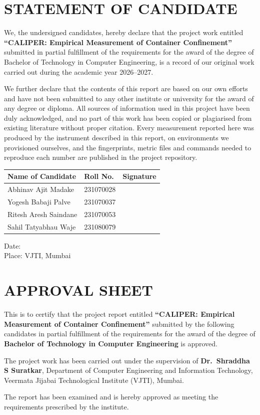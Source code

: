 \documentclass[12pt,a4paper,openany,oneside]{report}
\newcommand{\projecttitle}{CALIPER: Empirical Measurement of Container Confinement}
\newcommand{\degreename}{Bachelor of Technology in Computer Engineering}
\newcommand{\guidename}{Dr.~Shraddha S Suratkar}
\newcommand{\acadyear}{2026--2027}
\newcommand{\reportdate}{}
\renewcommand{\arraystretch}{1.12}
\newcommand{\candidatetable}{%
\begin{center}
\renewcommand{\arraystretch}{1.3}
\begin{tabular}{|p{6.2cm}|p{3.2cm}|p{4.2cm}|}
\hline
\textbf{Name of Candidate} & \textbf{Roll No.} & \textbf{Signature}\\ \hline
Abhinav Ajit Madake & 231070028 & \\ \hline
Yogesh Babaji Palve & 231070037 & \\ \hline
Ritesh Aresh Saindane & 231070053 & \\ \hline
Sahil Tatyabhau Waje & 231080079 & \\ \hline
\end{tabular}
\end{center}}
\begin{document}
\section*{\centering STATEMENT OF CANDIDATE}

We, the undersigned candidates, hereby declare that the project work entitled \textbf{``\projecttitle''} submitted in partial fulfillment of the requirements for the award of the degree of \degreename, is a record of our original work carried out during the academic year \acadyear.

We further declare that the contents of this report are based on our own efforts and have not been submitted to any other institute or university for the award of any degree or diploma. All sources of information used in this project have been duly acknowledged, and no part of this work has been copied or plagiarised from existing literature without proper citation. Every measurement reported here was produced by the instrument described in this report, on environments we provisioned ourselves, and the fingerprints, metric files and commands needed to reproduce each number are published in the project repository.

\vspace{1.2cm}
\candidatetable
\vspace{2.5cm}

\noindent Date: \reportdate\\
Place: VJTI, Mumbai

\clearpage
\section*{\centering APPROVAL SHEET}

This is to certify that the project report entitled \textbf{``\projecttitle''} submitted by the following candidates in partial fulfillment of the requirements for the award of the degree of \textbf{\degreename} is approved.

The project work has been carried out under the supervision of \textbf{\guidename}, Department of Computer Engineering and Information Technology, Veermata Jijabai Technological Institute (VJTI), Mumbai.

The report has been examined and is hereby approved as meeting the requirements prescribed by the institute.
\end{document}
